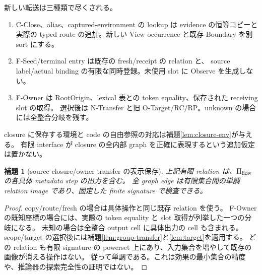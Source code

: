 \documentclass[11pt,a4paper]{article}
\newtheorem{lemma}[definition]{補題}
\begin{document}
新しい転送は三種類で尽くされる。
\begin{enumerate}
\item C-Close、alias、captured-environment の lookup は evidence の恒等コピーと
実際の typed route の追加。新しい View occurrence と既存 Boundary を別 sort にする。
\item F-Seed/terminal entry は既存の fresh/receipt の relation と、
source label/actual binding の有限な同時登録。未使用 slot に Observe を生成しない。
\item F-Owner は RootOrigin、lexical 表との token equality、保存された receiving slot の取得。
選択後は N-Transfer と旧 O-Target/RC/RP。unknown の場合には全整合分岐を残す。
\end{enumerate}
closure に保存する環境と code の自由参照の対応は補題\ref{lem:closure-env}が与える。
有限 interface が closure の全内部 graph を正確に表現するという追加仮定は置かない。

\begin{lemma}[source closure/owner transfer の表示保存]
\label{lem:flow-transfer}
上記有限 relation は、\(\Pi_{\rm flow}\) の各具体 metadata step の出力を含む。
全 graph edge は有限集合間の単調 relation image であり、固定した finite signature で検査できる。
\end{lemma}
\begin{proof}
copy/route/fresh の場合は具体操作と同じ既存 relation を使う。
F-Owner の既知座標の場合には、実際の token equality と slot 取得が列挙した一つの分岐になる。
未知の場合は全整合 output cell に具体出力の cell も含まれる。
scope/target の選択後には補題\ref{lem:group-transfer}と\ref{lem:target}を適用する。
どの relation も有限 signature の powerset 上にあり、入力集合を増やして既存の画像が消える操作はない。
従って単調である。これは効果の最小集合の精度や、推論器の探索完全性の証明ではない。
\end{proof}
\end{document}
